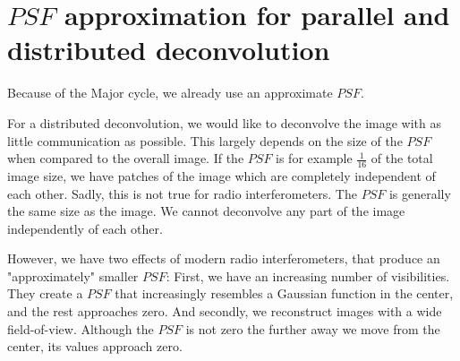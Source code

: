 \section{$PSF$ approximation for parallel and distributed deconvolution} \label{gradients}
Because of the Major cycle, we already use an approximate $PSF$.

For a distributed deconvolution, we would like to deconvolve the image with as little communication as possible. This largely depends on the size of the $PSF$ when compared to the overall image. If the $PSF$ is for example $\frac{1}{16}$ of the total image size, we have patches of the image which are completely independent of each other. Sadly, this is not true for radio interferometers. The $PSF$ is generally the same size as the image. We cannot deconvolve any part of the image independently of each other.

However, we have two effects of modern radio interferometers, that produce an "approximately" smaller $PSF$: First, we have an increasing number of visibilities. They create a $PSF$ that increasingly resembles a Gaussian function in the center, and the rest approaches zero. And secondly, we reconstruct images with a wide field-of-view. Although the $PSF$ is not zero the further away we move from the center, its values approach zero.

